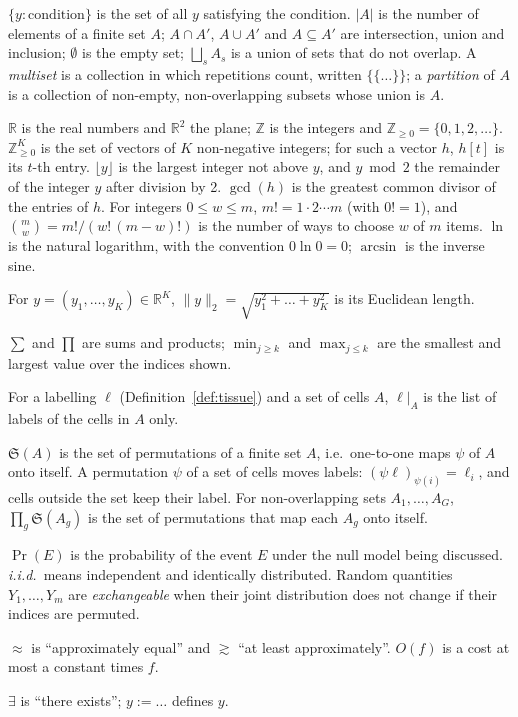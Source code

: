 \documentclass[11pt,a4paper]{article}
\theoremstyle{remark}
\newcommand{\lab}{\ell}
\newcommand{\Real}{\mathbb{R}}
\newcommand{\Int}{\mathbb{Z}}
\newcommand{\Nat}{\mathbb{Z}_{\ge 0}}
\newcommand{\Sym}{\mathfrak{S}}
\newcommand{\mset}[1]{\{\!\{#1\}\!\}}
\begin{document}
\begin{description}[style=unboxed,leftmargin=0pt,itemsep=3pt]
  \item[Sets.] $\{y:\text{condition}\}$ is the set of all $y$ satisfying the
    condition. $|A|$ is the number of elements of a finite set $A$;
    $A\cap A'$, $A\cup A'$ and $A\subseteq A'$ are intersection, union and
    inclusion; $\emptyset$ is the empty set; $\bigsqcup_s A_s$ is a union of
    sets that do not overlap. A \emph{multiset} is a collection in which
    repetitions count, written $\mset{\dots}$; a \emph{partition} of $A$ is a
    collection of non-empty, non-overlapping subsets whose union is $A$.
  \item[Numbers.] $\Real$ is the real numbers and $\Real^2$ the plane;
    $\Int$ is the integers and $\Nat=\{0,1,2,\dots\}$. $\Nat^K$ is the set of
    vectors of $K$ non-negative integers; for such a vector $h$, $h[t]$ is its
    $t$-th entry. $\lfloor y\rfloor$ is the largest integer not above $y$, and
    $y\bmod 2$ the remainder of the integer $y$ after division by 2.
    $\gcd(h)$ is the greatest common divisor of the entries of $h$.
    For integers $0\le w\le m$, $m!=1\cdot2\cdots m$ (with $0!=1$), and
    $\binom{m}{w}=m!/(w!\,(m-w)!)$ is the number of ways to choose $w$ of $m$
    items. $\ln$ is the natural logarithm, with the
    convention $0\ln0=0$; $\arcsin$ is the inverse sine.
  \item[Length.] For $y=(y_1,\dots,y_K)\in\Real^K$,
    $\lVert y\rVert_2=\sqrt{y_1^2+\dots+y_K^2}$ is its Euclidean length.
  \item[Sums and extremes.] $\sum$ and $\prod$ are sums and products;
    $\min_{j\ge k}$ and $\max_{j\le k}$ are the smallest and largest value
    over the indices shown.
  \item[Restriction.] For a labelling $\lab$ (Definition~\ref{def:tissue})
    and a set of cells $A$, $\lab|_A$ is the list of labels of the cells in
    $A$ only.
  \item[Permutations.] $\Sym(A)$ is the set of permutations of a finite set
    $A$, i.e.\ one-to-one maps $\psi$ of $A$ onto itself. A permutation $\psi$
    of a set of cells moves labels: $(\psi\lab)_{\psi(i)}=\lab_i$, and cells
    outside the set keep their label. For non-overlapping sets
    $A_1,\dots,A_G$, $\prod_g\Sym(A_g)$ is the set of permutations that map
    each $A_g$ onto itself.
  \item[Probability.] $\Pr(E)$ is the probability of the event $E$ under the
    null model being discussed. \emph{i.i.d.}\ means independent and
    identically distributed. Random quantities $Y_1,\dots,Y_m$ are
    \emph{exchangeable} when their joint distribution does not change if
    their indices are permuted.
  \item[Approximation and cost.] $\approx$ is ``approximately equal'' and
    $\gtrsim$ ``at least approximately''. $O(f)$ is a cost at most a constant
    times $f$.
  \item[Logic.] $\exists$ is ``there exists''; $y:=\dots$ defines $y$.
\end{description}
\end{document}

